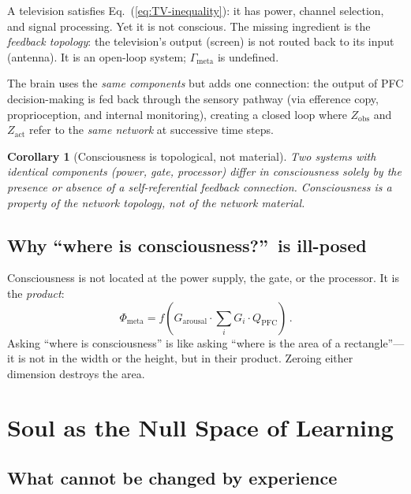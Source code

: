 \documentclass[aps,pre,twocolumn,superscriptaddress,floatfix]{revtex4-2}
\newtheorem{corollary}{Corollary}
\newcommand{\Gmeta}{\Gamma_{\text{meta}}}
\newcommand{\Phimeta}{\Phi_{\text{meta}}}
\newcommand{\Zarousal}{G_{\text{arousal}}}
\newcommand{\QPFC}{Q_{\text{PFC}}}
\begin{document}
A television satisfies Eq.~(\ref{eq:TV-inequality}): it has
power, channel selection, and signal processing.
Yet it is not conscious.  The missing ingredient is the
\emph{feedback topology}: the television's output (screen)
is not routed back to its input (antenna).
It is an open-loop system; $\Gmeta$ is undefined.

The brain uses the \emph{same components} but adds one
connection: the output of PFC decision-making is fed back
through the sensory pathway (via efference copy, proprioception,
and internal monitoring), creating a closed loop where
$Z_{\text{obs}}$ and $Z_{\text{act}}$ refer to the
\emph{same network} at successive time steps.

\begin{corollary}[Consciousness is topological, not material]
Two systems with identical components (power, gate, processor)
differ in consciousness solely by the presence or absence of
a self-referential feedback connection.
Consciousness is a property of the network \emph{topology},
not of the network \emph{material}.
\end{corollary}

\subsection{Why ``where is consciousness?''\ is ill-posed}

Consciousness is not located at the power supply, the gate,
or the processor.  It is the \emph{product}:
\begin{equation}
  \Phimeta = f\!\left(
    \Zarousal \cdot \textstyle\sum_i G_i \cdot \QPFC
  \right)\,.
  \label{eq:consciousness-product}
\end{equation}
Asking ``where is consciousness'' is like asking ``where is
the area of a rectangle''---it is not in the width or the
height, but in their product.  Zeroing either dimension
destroys the area.


\section{Soul as the Null Space of Learning}
\label{sec:soul}

\subsection{What cannot be changed by experience}
\end{document}
